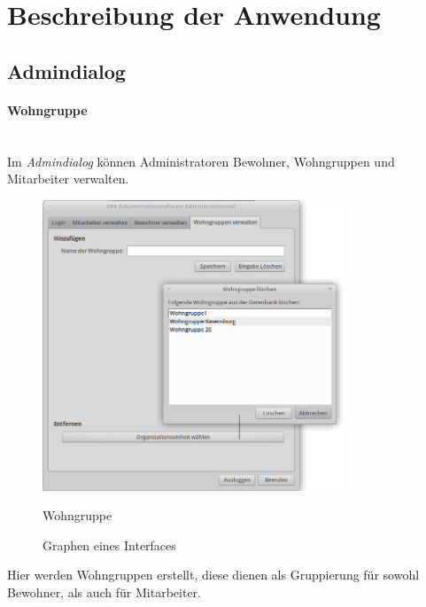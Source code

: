\section{Beschreibung der Anwendung}
\label{sec:beschreibung}
\subsection{Admindialog}
\paragraph{Wohngruppe}\mbox{}\\
Im \textit{Admindialog} können Administratoren Bewohner, Wohngruppen und Mitarbeiter verwalten.
\begin{figure}[h]
	\begin{center}
		\includegraphics[keepaspectratio=true, width=0.8\textwidth]{pics/admin3.png}
		\caption{Wohngruppe}
		\label{Admindialog Wohngruppe}
		\caption{Graphen eines Interfaces}
		\label{Admindialog_Mitarbeiter_erstellen}
	\end{center}
\end{figure}
\FloatBarrier
\noindent
Hier werden Wohngruppen erstellt, diese dienen als Gruppierung für sowohl Bewohner, als auch für Mitarbeiter.
\newpage
\noindent
